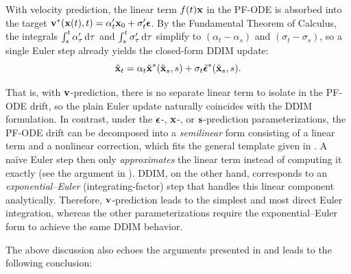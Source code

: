 With velocity prediction, the linear term $f(t){\mathbf{x}}$ in the PF-ODE is absorbed into the
target ${\mathbf{v}}^*({\mathbf{x}}(t), t)=\alpha_t'{\mathbf{x}}_0+\sigma_t'{\bm{\epsilon}}$. By the Fundamental Theorem of Calculus,
the integrals $\int_s^t \alpha_\tau'\mathop{}\!\mathrm{d}\tau$ and $\int_s^t \sigma_\tau'\mathop{}\!\mathrm{d}\tau$
simplify to $(\alpha_t-\alpha_s)$ and $(\sigma_t-\sigma_s)$, so a single Euler step
already yields the closed-form DDIM update:
\[
\tilde{{\mathbf{x}}}_t = \alpha_t \tilde{{\mathbf{x}}}^*(\tilde{{\mathbf{x}}}_s,s) + \sigma_t \tilde{{\bm{\epsilon}}}^*(\tilde{{\mathbf{x}}}_s,s).
\]

That is, with ${\mathbf{v}}$-prediction, there is no separate linear term to isolate in the PF-ODE drift, 
so the plain Euler update naturally coincides with the DDIM formulation.  
In contrast, under the ${\bm{\epsilon}}$-, ${\mathbf{x}}$-, or ${\mathbf{s}}$-prediction parameterizations, 
the PF-ODE drift can be decomposed into a \emph{semilinear} form consisting of a linear term and a nonlinear correction, 
which fits the general template given in . A naïve Euler step then only \emph{approximates} the linear term instead of computing it exactly 
(see the argument in ). DDIM, on the other hand, corresponds to an \emph{exponential--Euler} (integrating-factor) step 
that handles this linear component analytically.  
Therefore, ${\mathbf{v}}$-prediction leads to the simplest and most direct Euler integration, 
whereas the other parameterizations require the exponential--Euler form to achieve the same DDIM behavior.

The above discussion also echoes the arguments presented in  
and leads to the following conclusion:





